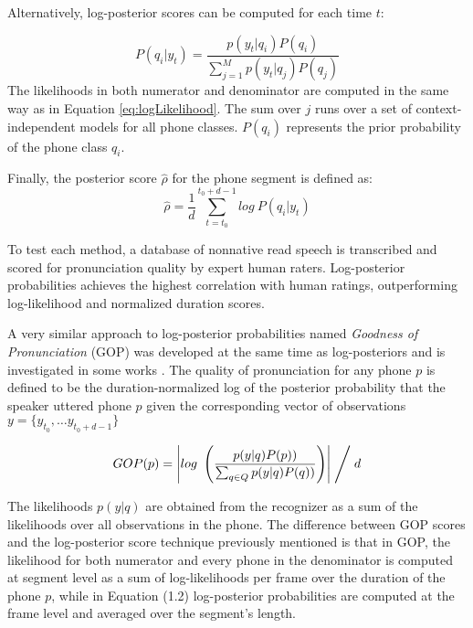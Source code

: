 Alternatively, log-posterior scores can be computed for each time $t$:

\begin{equation}
P(q_{i}|y_{t}) = \frac{p(y_{t}|q_{i})P(q_{i})}{\sum\limits_{j=1}^{M} p(y_{t}|q_{j})P(q_{j})}
\end{equation}
The likelihoods in both numerator and denominator are computed in the same way as in 
Equation \ref{eq:logLikelihood}. 
The sum over $j$ runs over a set of context-independent models for all phone classes. $P(q_{i})$
represents the prior probability of the phone class $q_{i}$. 

Finally, the posterior score $\hat{\rho}$ for the phone segment is defined as:
\begin{equation}
\hat{\rho} = \frac{1}{d}\sum_{t=t_{0}}^{t_{0}+d-1} log \ P(q_{i}|y_{t})
\end{equation}

To test each method, a database of nonnative read speech is transcribed and scored for 
pronunciation quality by expert human raters. Log-posterior probabilities achieves the
highest correlation with human ratings, outperforming log-likelihood and normalized duration
scores.

A very similar approach to log-posterior probabilities named \textit{Goodness of Pronunciation}
(GOP) was developed at the same time as log-posteriors and
is investigated in some works \cite{gop_1, gop_2, gop_3}. The quality of 
pronunciation for any phone $p$ is defined to be the duration-normalized log of the posterior
probability that the speaker uttered phone $p$ given the corresponding vector of observations
$y=\{y_{t_{0}}, \dotsc y_{t_{0}+d-1} \}$

\begin{equation}
GOP(p) = \left| log \ \left(\frac{p(y|q)P(p))}{\sum_{q \in Q}p(y|q)P(q))}\right) \right| \Biggm/ d 
\end{equation}

The likelihoods $p(y|q)$ are obtained from the recognizer as a sum of the likelihoods over all
observations in the phone.
The difference between GOP scores and the log-posterior score technique previously mentioned 
is that in GOP, the likelihood for both numerator and every phone in the denominator is
computed at segment level as a sum of log-likelihoods per frame over the 
duration of the phone $p$, while in Equation (1.2) log-posterior probabilities are computed
at the frame level and averaged over the segment's length.

